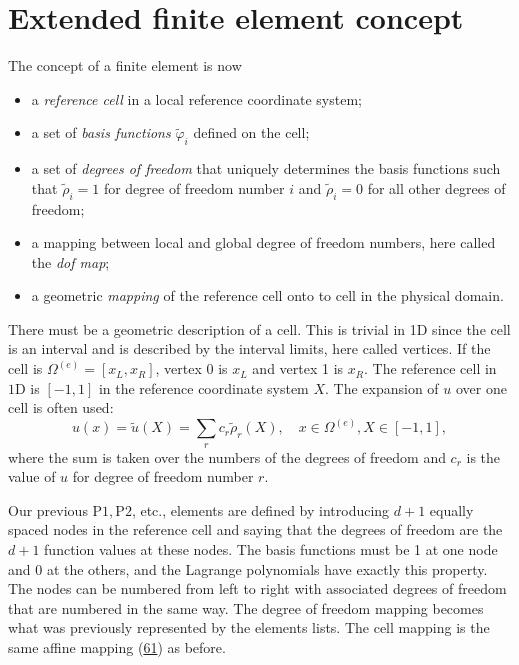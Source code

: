 \documentclass[../main.tex]{subfiles}
\begin{document}
\section[Extended finite element concept]{Extended finite element concept}
\label{sec:sec_6_2}
The concept of a finite element is now
\begin{itemize}
	\item a \textit{reference cell} in a local reference coordinate system;
	\item a set of \textit{basis functions} $\tilde{\varphi}_{i}$ defined on the cell;
	\item a set of \textit{degrees of freedom} that uniquely determines the basis functions such that $\tilde{\rho}_{i}=1$ for degree of freedom number $i$ and $\tilde{\rho}_{i}=0$ for all other degrees of freedom;
	\item a mapping between local and global degree of freedom numbers, here called the \textit{dof map};
	\item a geometric \textit{mapping} of the reference cell onto to cell in the physical domain.
\end{itemize}
There must be a geometric description of a cell. This is trivial in 1D since the
cell is an interval and is described by the interval limits, here called vertices. If the cell is $\Omega^{(e)}=\left[x_{L}, x_{R}\right]$, vertex 0 is $x_{L}$ and vertex 1 is $x_{R}$. The reference cell in $1 \mathrm{D}$ is $[-1,1]$ in the reference coordinate system $X$.
The expansion of $u$ over one cell is often used:
\begin{equation}\label{eqa92}
	u(x)=\tilde{u}(X)=\sum_{r} c_{r} \tilde{\rho}_{r}(X), \quad x \in \Omega^{(e)}, X \in[-1,1],
\end{equation}
where the sum is taken over the numbers of the degrees of freedom and $c_{r}$ is the value of $u$ for degree of freedom number $r$.

Our previous $\mathrm{P} 1, \mathrm{P} 2$, etc., elements are defined by introducing $d+1$ equally spaced nodes in the reference cell and saying that the degrees of freedom are the $d+1$ function values at these nodes. The basis functions must be 1 at one node and 0 at the others, and the Lagrange polynomials have exactly this property. The nodes can be numbered from left to right with associated degrees of freedom that are numbered in the same way. The degree of freedom mapping becomes what was previously represented by the elements lists. The cell mapping is the same affine mapping (\hyperref[eqa61]{61}) as before.
\end{document}
